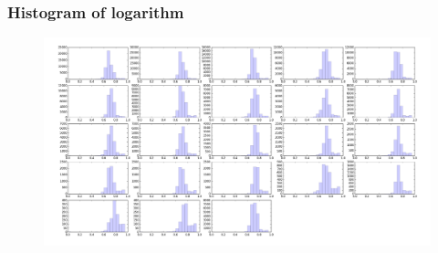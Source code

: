 \documentclass{beamer}
\begin{document}
\begin{frame}
    \frametitle{Histogram of logarithm}
    \begin{figure}[H]
        \centering
        \includegraphics[width=1.05\textwidth]{figures/pyr_hist_1mb.png}
        \caption*{}
        \label{fig:pyr_hist_1mb}
    \end{figure}
\end{frame}
\end{document}
